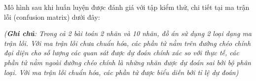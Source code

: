 Mô hình sau khi huấn luyện được đánh giá với tập kiểm thử, chi tiết tại ma trận lỗi (confusion matrix) dưới đây:


\textit{(\textbf{Ghi chú}: Trong cả 2 bài toán 2 nhãn và 10 nhãn, đồ án sử dụng 2 loại dạng ma trận lỗi. Với ma trận lỗi chưa chuẩn hóa, các phần tử nằm trên đường chéo chính đại diện cho số lượng các quan sát được dự đoán chính xác so với thực tế, các phần tử nằm ngoài đường chéo chính là những nhãn được dự đoán sai bởi bộ phân loại. Với ma trận lỗi chuẩn hóa, các phần tử được biểu diễn bởi tỉ lệ dự đoán)}

